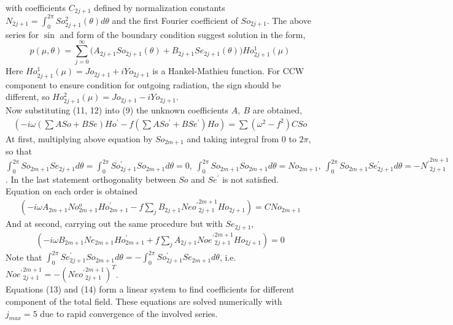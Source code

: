 with coefficients $C_{2j + 1}$ defined by normalization constants $N_{2j + 1} = \int_{0}^{2\pi} So_{2j + 1}^2(\theta) d \theta$ and the first Fourier coefficient of $So_{2j + 1}$. The above series for $\sin$ and form of the boundary condition suggest solution in the form,
\begin{equation}
p(\mu, \theta) = \sum_{j = 0}^{\infty} \big( A_{2j+1} So_{2j + 1}(\theta) + B_{2j+1} Se_{2j + 1}(\theta) \big) Ho^{1}_{2j + 1}(\mu)
\end{equation}
Here $Ho^{1}_{2j + 1}(\mu) = Jo_{2j + 1} + i Yo_{2j + 1}$ is a Hankel-Mathieu function. For CCW component to ensure condition for outgoing radiation, the sign should be different, so $Ho^{2}_{2j + 1}(\mu) = Jo_{2j + 1} - i Yo_{2j + 1}$.\\
Now substituting (11, 12) into (9) the unknown coefficients $A,~B$ are obtained,
\begin{align*}
(-i\omega (\sum A So + B Se) Ho^{\prime} - f (\sum A So^{\prime} + B Se^{\prime}) Ho) = \sum (\omega^2 - f^2) C So
\end{align*}
At first, multiplying above equation by $So_{2m + 1}$ and taking integral from 0 to $2 \pi$, so that $\int_{0}^{2\pi} So_{2m + 1} Se_{2j + 1} d \theta = \int_0^{2 \pi} So_{2j + 1}^{\prime} So_{2m + 1} d \theta = 0,~\int_0^{2 \pi} So_{2m + 1} So_{2m+1} d \theta = No_{2m + 1},~\int_0^{2 \pi} So_{2m + 1} Se_{2j + 1}^{\prime} d \theta = -{N^{\prime}}^{2m+1}_{2j + 1}$. In the last statement orthogonality between $So$ and $Se^{\prime}$ is not satisfied. Equation on each order is obtained
\begin{align}
(-i \omega A_{2m + 1} No_{2m + 1}^o Ho_{2m + 1}^{\prime} - f \sum_{j} B_{2j + 1} {Neo^{\prime}}^{2m + 1}_{2j + 1} Ho_{2j + 1}) = C No_{2m + 1}
\end{align}
And at second, carrying out the same procedure but with $Se_{2j + 1}$,
\begin{align}
(-i \omega B_{2m + 1} Ne_{2m + 1} Ho_{2m + 1}^{\prime} + f \sum_j A_{2j + 1} {Noe^{\prime}}^{2m + 1}_{2j + 1} Ho_{2j + 1}) = 0
\end{align}
Note that $\int_0^{2\pi} Se^{\prime}_{2j + 1} So_{2m + 1} d \theta = -\int_0^{2\pi} So^{\prime}_{2j + 1} Se_{2m + 1} d \theta$, i.e. ${Noe^{\prime}}^{2m + 1}_{2j + 1} = -({Neo^{\prime}}^{2m + 1}_{2j + 1})^T$.\\
Equations (13) and (14) form a linear system to find coefficients for different component of the total field. These equations are solved numerically with $j_{max} = 5$ due to rapid convergence of the involved series.
